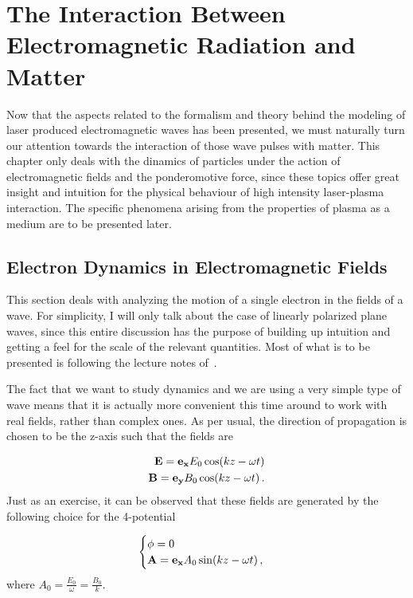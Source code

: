 \documentclass[12pt, class=report, crop=false]{standalone}
\begin{document}
\chapter{The Interaction Between Electromagnetic Radiation and Matter}%
\label{chap:light-matter-interaction}
Now that the aspects related to the formalism and theory behind the modeling of laser produced electromagnetic waves has been presented, we must naturally turn our attention towards the interaction of those wave pulses with matter. This chapter only deals with the dinamics of particles under the action of electromagnetic fields and the ponderomotive force, since these topics offer great insight and intuition for the physical behaviour of high intensity laser-plasma interaction. The specific phenomena arising from the properties of plasma as a medium are to be presented later.
\section{Electron Dynamics in Electromagnetic Fields}
This section deals with analyzing the motion of a single electron in the fields of a wave. For simplicity, I will only talk about the case of linearly polarized plane waves, since this entire discussion has the purpose of building up intuition and getting a feel for the scale of the relevant quantities. Most of what is to be presented is following the lecture notes of~\cite{karschApplicationsHighIntensity2018}.

The fact that we want to study dynamics and we are using a very simple type of wave means that it is actually more convenient this time around to work with real fields, rather than complex ones. As per usual, the direction of propagation is chosen to be the z-axis such that the fields are

\begin{subequations}
  \begin{align}
    \vb{E} =\vb{e_x} E_0 \cos(kz-\omega t) \\
    \vb{B} =\vb{e_y} B_0 \cos(kz-\omega t)\,.
  \end{align}
\end{subequations}
Just as an exercise, it can be observed that these fields are generated by the following choice for the 4-potential

\begin{equation}
  \label{choice:potentials}
  \begin{cases}
    \phi = 0 \\
    \vb{A} = \vb{e_x} A_0 \sin(kz-\omega t)\,,
  \end{cases}
\end{equation}
where \(A_0 = \frac{E_0}{\omega} = \frac{B_0}{k}\).
\end{document}
